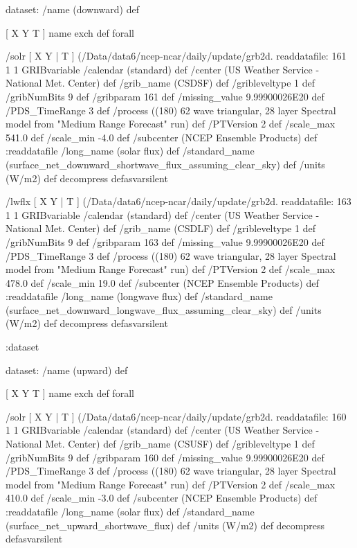 \begin{ingrid}
   dataset: /name (downward) def

    [ X Y T ] { name exch def } forall

    /solr { [ X Y | T ] (/Data/data6/ncep-ncar/daily/update/grb2d.%
    readdatafile:
    161 1 1 GRIBvariable
    /calendar (standard) def
    /center (US Weather Service - National Met. Center) def
    /grib_name (CSDSF) def
    /gribleveltype 1 def
    /gribNumBits 9 def
    /gribparam 161 def
    /missing_value 9.99900026E20 def
    /PDS_TimeRange 3 def
    /process ((180) 62 wave triangular, 28 layer Spectral model from "Medium Range Forecast" run) def
    /PTVersion 2 def
    /scale_max 541.0 def
    /scale_min -4.0 def
    /subcenter (NCEP Ensemble Products) def
    :readdatafile
    /long_name (solar flux) def
    /standard_name (surface_net_downward_shortwave_flux_assuming_clear_sky) def 
    /units (W/m2) def
    decompress
    } defasvarsilent

    /lwflx { [ X Y | T ] (/Data/data6/ncep-ncar/daily/update/grb2d.%
    readdatafile:
    163 1 1 GRIBvariable
    /calendar (standard) def
    /center (US Weather Service - National Met. Center) def
    /grib_name (CSDLF) def
    /gribleveltype 1 def
    /gribNumBits 9 def
    /gribparam 163 def
    /missing_value 9.99900026E20 def 
    /PDS_TimeRange 3 def
    /process ((180) 62 wave triangular, 28 layer Spectral model from "Medium Range Forecast" run) def
    /PTVersion 2 def
    /scale_max 478.0 def
    /scale_min 19.0 def
    /subcenter (NCEP Ensemble Products) def
    :readdatafile
    /long_name (longwave flux) def
    /standard_name (surface_net_downward_longwave_flux_assuming_clear_sky) def
    /units (W/m2) def
    decompress
    } defasvarsilent

   :dataset

   dataset: /name (upward) def

    [ X Y T ] { name exch def } forall

    /solr { [ X Y | T ] (/Data/data6/ncep-ncar/daily/update/grb2d.%
    readdatafile:
    160 1 1 GRIBvariable
    /calendar (standard) def
    /center (US Weather Service - National Met. Center) def
    /grib_name (CSUSF) def
    /gribleveltype 1 def
    /gribNumBits 9 def
    /gribparam 160 def
    /missing_value 9.99900026E20 def 
    /PDS_TimeRange 3 def
    /process ((180) 62 wave triangular, 28 layer Spectral model from "Medium Range Forecast" run) def
    /PTVersion 2 def
    /scale_max 410.0 def
    /scale_min -3.0 def
    /subcenter (NCEP Ensemble Products) def
    :readdatafile
    /long_name (solar flux) def
    /standard_name (surface_net_upward_shortwave_flux) def
    /units (W/m2) def
    decompress
    } defasvarsilent


\end{ingrid}

